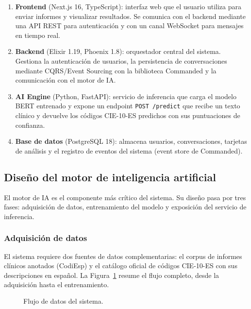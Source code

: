 \begin{enumerate}
 \item \textbf{Frontend} (Next.js 16, TypeScript): interfaz web que el usuario utiliza para enviar informes y visualizar resultados. Se comunica con el backend mediante una API REST para autenticación y con un canal WebSocket para mensajes en tiempo real.
 \item \textbf{Backend} (Elixir 1.19, Phoenix 1.8): orquestador central del sistema. Gestiona la autenticación de usuarios, la persistencia de conversaciones mediante CQRS/Event Sourcing con la biblioteca Commanded y la comunicación con el motor de IA.
 \item \textbf{AI Engine} (Python, FastAPI): servicio de inferencia que carga el modelo BERT entrenado y expone un endpoint \texttt{POST /predict} que recibe un texto clínico y devuelve los códigos CIE-10-ES predichos con sus puntuaciones de confianza.
 \item \textbf{Base de datos} (PostgreSQL 18): almacena usuarios, conversaciones, tarjetas de análisis y el registro de eventos del sistema (event store de Commanded).
\end{enumerate}

\subsection{Diseño del motor de inteligencia artificial}

El motor de IA es el componente más crítico del sistema. Su diseño pasa por tres fases: adquisición de datos, entrenamiento del modelo y exposición del servicio de inferencia.

\subsubsection{Adquisición de datos}
\label{sec:adquisicion}

El sistema requiere dos fuentes de datos complementarias: el corpus de informes clínicos anotados (CodiEsp) y el catálogo oficial de códigos CIE-10-ES con sus descripciones en español. La Figura~\ref{fig:pipeline-datos} resume el flujo completo, desde la adquisición hasta el entrenamiento.

\begin{figure}[ht]
\centering
\resizebox{\textwidth}{!}{}
\caption{Flujo de datos del sistema.}
\label{fig:pipeline-datos}
\end{figure}

